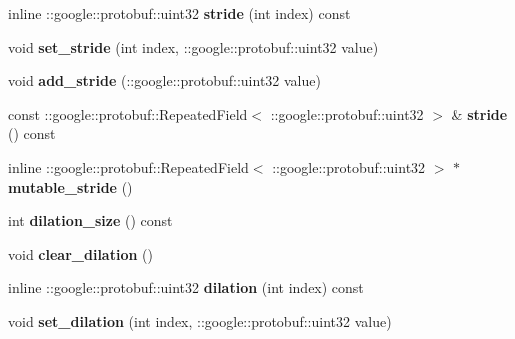 \begin{DoxyCompactItemize}
inline \+::google\+::protobuf\+::uint32 {\bfseries stride} (int index) const
\item 
\mbox{\label{classcaffe_1_1_convolution_parameter_ac97ec932914584008fc3e2151c0b2da4}} 
void {\bfseries set\+\_\+stride} (int index, \+::google\+::protobuf\+::uint32 value)
\item 
\mbox{\label{classcaffe_1_1_convolution_parameter_ab772fed0e634d2b8da7d05acc2cd0473}} 
void {\bfseries add\+\_\+stride} (\+::google\+::protobuf\+::uint32 value)
\item 
\mbox{\label{classcaffe_1_1_convolution_parameter_a72c12139ac054cf1308b6e8a5506a6ce}} 
const \+::google\+::protobuf\+::\+Repeated\+Field$<$ \+::google\+::protobuf\+::uint32 $>$ \& {\bfseries stride} () const
\item 
\mbox{\label{classcaffe_1_1_convolution_parameter_ad36a0f1bcf96311fde84c52ea46f9772}} 
inline \+::google\+::protobuf\+::\+Repeated\+Field$<$ \+::google\+::protobuf\+::uint32 $>$ $\ast$ {\bfseries mutable\+\_\+stride} ()
\item 
\mbox{\label{classcaffe_1_1_convolution_parameter_a9df82fad024e56bcfbada69ca6247c4f}} 
int {\bfseries dilation\+\_\+size} () const
\item 
\mbox{\label{classcaffe_1_1_convolution_parameter_a3aa1e655233b514bb0a3ae8d2eb7a2e3}} 
void {\bfseries clear\+\_\+dilation} ()
\item 
\mbox{\label{classcaffe_1_1_convolution_parameter_a36315a344d7070ec5d263f6b97fff4a5}} 
inline \+::google\+::protobuf\+::uint32 {\bfseries dilation} (int index) const
\item 
\mbox{\label{classcaffe_1_1_convolution_parameter_a819f4aa9ddba60f731aae1e5e4042587}} 
void {\bfseries set\+\_\+dilation} (int index, \+::google\+::protobuf\+::uint32 value)
\item 
\mbox{\label{classcaffe_1_1_convolution_parameter_ae8ad5999f4b38b5fd408aa394f51ba9f}} 

\end{DoxyCompactItemize}
